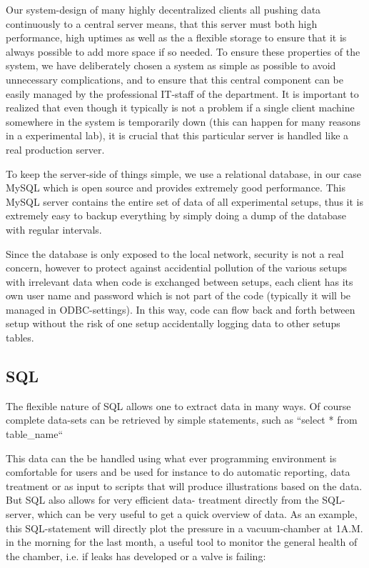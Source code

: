Our system-design of many highly decentralized clients all pushing data
continuously to a central server means, that this server must both high
performance, high uptimes as well as the a flexible storage to ensure that it is
always possible to add more space if so needed. To ensure these properties of
the system, we have deliberately chosen a system as simple as possible to avoid
unnecessary complications, and to ensure that this central component can be
easily managed by the professional IT-staff of the department. It is
important to realized that even though it typically is not a problem if a
single client machine somewhere in the system is temporarily down (this can
happen for many reasons in a experimental lab), it is crucial that this
particular server is handled like a real production server.

To keep the server-side of things simple, we use a relational database, in our
case MySQL\cite{mysql} which is open source and provides extremely good
performance. This MySQL server contains the entire set of data of all
experimental setups, thus it is extremely easy to backup everything by simply
doing a dump of the database with regular intervals.

Since the database is only exposed to the local network, security is not a
real concern, however to protect against accidential pollution of the
various setups with irrelevant data when code is exchanged between setups, each
client has its own user name and password which is not part of the code
(typically it will be managed in ODBC-settings). In this way, code can flow back
and forth between setup without the risk of one setup accidentally logging data
to other setups tables.

\subsection{SQL}
The flexible nature of SQL allows one to extract data in many ways. Of course
complete data-sets can be retrieved by simple statements, such as 
``select {*} from table\_name``

 This data can the be handled using what ever programming
environment is comfortable for users and be used for instance to do automatic
reporting, data treatment or as input to scripts that will produce
illustrations based on the data. But SQL also allows for very efficient data-
treatment directly from the SQL-server, which can be very useful to get a
quick overview of data. As an example, this SQL-statement will directly plot
the pressure in a vacuum-chamber at 1A.M. in the morning for the last month, a
useful tool to monitor the general health of the chamber, i.e. if leaks has
developed or a valve is failing:

